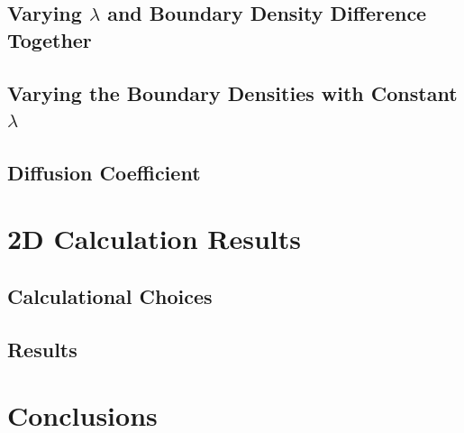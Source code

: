 \subsection{Varying $\lambda$ and Boundary Density Difference Together}
\subsection{Varying the Boundary Densities with Constant $\lambda$}
\subsection{Diffusion Coefficient}

\section{2D Calculation Results}
\subsection{Calculational Choices}
\subsection{Results}

\section{Conclusions}
